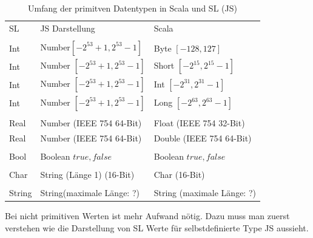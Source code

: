 \documentclass[12pt]{scrreprt}
\begin{document}
\begin{table}
\caption{Umfang der primitven Datentypen in Scala und \ac{SL} (\ac{JS})}
\centering
\begin{tabular}{lll}
 \ac{SL} &    \ac{JS} Darstellung              &    Scala \\
\\
Int  &  Number\footnotemark $[-2^{53} + 1, 2^{53} -1]$   &  Byte  $[-128, 127]$\\
Int  &  Number $[-2^{53} + 1, 2^{53} -1]$   &  Short $[-2^{15}, 2^{15}-1]$\\
Int  & Number $[-2^{53} + 1, 2^{53} -1]$    & Int   $[-2^{31}, 2^{31}-1]$\\
Int  &  Number $[-2^{53} + 1, 2^{53} -1]$   &  Long  $[-2^{63}, 2^{63}-1]$\\
\\
Real &  Number (IEEE 754 64-Bit)      &  Float  (IEEE 754 32-Bit)\\
Real &  Number (IEEE 754 64-Bit)      &  Double (IEEE 754 64-Bit)\\
\\
Bool &  Boolean ${true, false}$         &  Boolean ${true, false}$\\
\\
Char &  String (Länge 1) (16-Bit)     &  Char (16-Bit)\\
\\
String& String\footnotemark (maximale Länge: ?)    &  String (maximale Länge: ?)\\
\end{tabular}
\label{tab:primitives-borders}
\end{table}


Bei nicht primitiven Werten ist mehr Aufwand nötig. Dazu muss man zuerst verstehen wie die Darstellung von \ac{SL} Werte für selbstdefinierte Type \ac{JS} aussieht.
\end{document}
